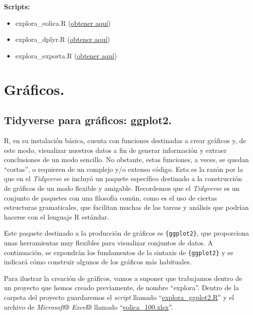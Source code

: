 \documentclass[
]{book}
\begin{document}
\textbf{Scripts:}

\begin{itemize}
\item
  explora\_eolica.R (\href{https://drive.google.com/file/d/1_rt1TtlYGU0VWtnvkWLpxM_MDGOrSFYZ/view?usp=drive_link}{obtener aquí})
\item
  explora\_dplyr.R (\href{https://drive.google.com/file/d/1Is4XOd6EmFswB6w2eZfC8_pp2mtu7aQK/view?usp=drive_link}{obtener aquí})
\item
  explora\_exporta.R (\href{https://drive.google.com/file/d/1NVkpJ6toD3pWJsE0w628Sf4e_c5dcffR/view?usp=sharing}{obtener aquí})
\end{itemize}

\chapter{Gráficos.}\label{gruxe1ficos.}

\section{Tidyverse para gráficos: ggplot2.}\label{tidyverse-para-gruxe1ficos-ggplot2.}

R, en su instalación básica, cuenta con funciones destinadas a crear gráficos y, de este modo, visualizar nuestros datos a fin de generar información y extraer conclusiones de un modo sencillo. No obstante, estas funciones, a veces, se quedan ``cortas'', o requieren de un complejo y/o extenso código. Esta es la razón por la que en el \emph{Tidyverse} se incluyó un paquete específico destinado a la construcción de gráficos de un modo flexible y amigable. Recordemos que el \emph{Tidyverse} es un conjunto de paquetes con una filosofía común, como es el uso de ciertas estructuras gramaticales, que facilitan muchas de las tareas y análisis que podrían hacerse con el lenguaje R estándar.

Este paquete destinado a la producción de gráficos es \texttt{\{ggplot2\}}, que proporciona unas herramientas muy flexibles para visualizar conjuntos de datos. A continuación, se expondrán los fundamentos de la sintaxis de \texttt{\{ggplot2\}} y se indicará cómo construir algunos de los gráficos más habituales.

Para ilustrar la creación de gráficos, vamos a suponer que trabajamos dentro de un proyecto que hemos creado previamente, de nombre ``explora''. Dentro de la carpeta del proyecto guardaremos el \emph{script} llamado ``\href{https://drive.google.com/file/d/1Is4XOd6EmFswB6w2eZfC8_pp2mtu7aQK/view?usp=drive_link}{explora\_ggplot2.R}'' y el archivo de \emph{Microsoft® Excel®} llamado ``\href{https://docs.google.com/spreadsheets/d/1Up5ZWR57rgIkmYJcr2Pek6kUdG_yd4vu/edit?usp=drive_link&ouid=115375878280465826079&rtpof=true&sd=true}{eolica\_100.xlsx}''.
\end{document}
